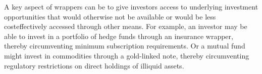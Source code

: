 \documentclass[11pt]{article}
\begin{document}
A key aspect of wrappers can be to give investors access to underlying investment opportunities that would otherwise not be available or would be less costeffectively accessed through other means. For example, an investor may be able to invest in a portfolio of hedge funds through an insurance wrapper, thereby circumventing minimum subscription requirements. Or a mutual fund might invest in commodities through a gold-linked note, thereby circumventing regulatory restrictions on direct holdings of illiquid assets.
\end{document}
